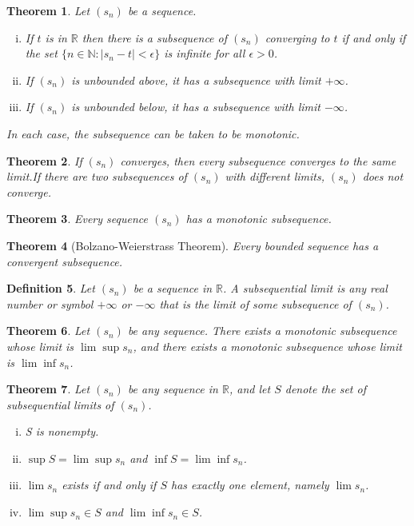 \documentclass[12pt, lettersize]{book}
\newtheorem{thm}{Theorem}[section]
\newtheorem{dfn}[thm]{Definition}
\begin{document}
	\setcounter{equation}{0}
	\begin{thm}\label{def:limit-subseq}
		Let $(s_n)$ be a sequence.
		\begin{enumerate}[(i)]
			\item If $t$ is in $\mathbb{R}$ then there is a subsequence of $(s_n)$ converging to $t$ if and only if
			the set $\{n\in\mathbb{N}: |s_n-t|<\epsilon\}$ is \emph{infinite} for all $\epsilon>0$.
			\item If $(s_n)$ is unbounded above, it has a subsequence with limit $+\infty$.
			\item If $(s_n)$ is unbounded below, it has a subsequence with limit $-\infty$.
		\end{enumerate}
		In each case, the subsequence can be taken to be \emph{monotonic}.
	\end{thm}
	
	\begin{thm}\label{def:subsequence converges to the same limit}
		If $(s_n)$ converges, then every subsequence converges to the same limit.If there are two subsequences of $(s_n)$ with different limits, $(s_n)$ does not converge.
	\end{thm}
	
	\begin{thm}
		Every sequence $(s_n)$ has a monotonic subsequence.
	\end{thm}
	\setcounter{equation}{0}
	
	\begin{thm}[Bolzano-Weierstrass Theorem]\label{def:B-W}
		Every bounded sequence has a convergent subsequence.
	\end{thm}
	
	\begin{dfn}
		Let $(s_n)$ be a sequence in $\mathbb{R}$. A \emph{subsequential limit} is any real number or symbol $+\infty$ or $-\infty$ that is the limit of some subsequence of $(s_n)$.
	\end{dfn}
	
	\setcounter{equation}{0}
	\begin{thm}\label{def:subsequence with limit limsup or liminf}
		Let $(s_n)$ be any sequence. There exists a monotonic subsequence whose limit is $\lim\sup s_n$, and there exists a monotonic subsequence whose limit is $\lim\inf s_n$.
	\end{thm}
	
	\begin{thm}\label{def:subsequential limit condition}
		Let $(s_n)$ be any sequence in $\mathbb{R}$, and let $S$ denote the set of subsequential limits of $(s_n)$.
		\begin{enumerate}[(i)]
			\item S is nonempty.
			\item $\sup S=\lim\sup s_n$ and $\inf S=\lim\inf s_n$.
			\item $\lim s_n$ exists if and only if $S$ has exactly one element, namely $\lim s_n$.
			\item $\lim\sup s_n\in S$ and $\lim\inf s_n\in S$.
		\end{enumerate}
	\end{thm}
	
\end{document}
